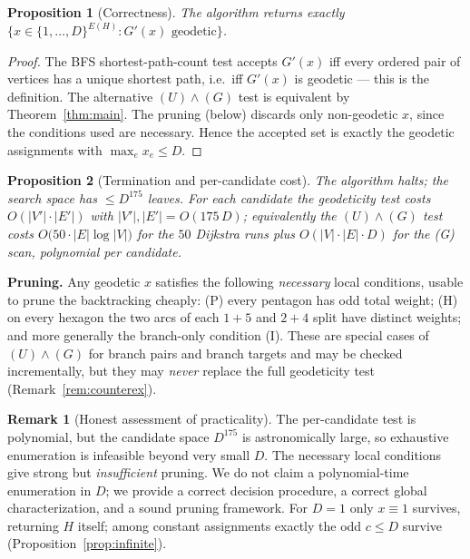 \documentclass{amsart}
\newtheorem{proposition}{Proposition}
\theoremstyle{definition}
\newtheorem{remark}{Remark}
\begin{document}
\begin{proposition}[Correctness]
The algorithm returns exactly $\{x\in\{1,\dots,D\}^{E(H)}:G'(x)\text{ geodetic}\}$.
\end{proposition}
\begin{proof}
The BFS shortest-path-count test accepts $G'(x)$ iff every ordered pair of
vertices has a unique shortest path, i.e.\ iff $G'(x)$ is geodetic --- this is
the definition. The alternative $(U)\wedge(G)$ test is equivalent by
Theorem~\ref{thm:main}. The pruning (below) discards only non-geodetic $x$, since
the conditions used are necessary. Hence the accepted set is exactly the geodetic
assignments with $\max_e x_e\le D$.
\end{proof}

\begin{proposition}[Termination and per-candidate cost]
The algorithm halts; the search space has $\le D^{175}$ leaves. For each
candidate the geodeticity test costs $O(|V'|\cdot|E'|)$ with
$|V'|,|E'|=O(175\,D)$; equivalently the $(U)\wedge(G)$ test costs
$O\!\big(50\cdot|E|\log|V|\big)$ for the $50$ Dijkstra runs plus
$O(|V|\cdot|E|\cdot D)$ for the (G) scan, polynomial per candidate.
\end{proposition}

\noindent\textbf{Pruning.} Any geodetic $x$ satisfies the following \emph{necessary}
local conditions, usable to prune the backtracking cheaply:
(P) every pentagon has odd total weight; (H) on every hexagon the two arcs of
each $1{+}5$ and $2{+}4$ split have distinct weights; and more generally the
branch-only condition (I). These are special cases of $(U)\wedge(G)$ for branch
pairs and branch targets and may be checked incrementally, but they may
\emph{never} replace the full geodeticity test (Remark~\ref{rem:counterex}).

\begin{remark}[Honest assessment of practicality]
The per-candidate test is polynomial, but the candidate space $D^{175}$ is
astronomically large, so exhaustive enumeration is infeasible beyond very small
$D$. The necessary local conditions give strong but \emph{insufficient} pruning.
We do not claim a polynomial-time enumeration in $D$; we provide a correct
decision procedure, a correct global characterization, and a sound pruning
framework. For $D=1$ only $x\equiv1$ survives, returning $H$ itself; among
constant assignments exactly the odd $c\le D$ survive
(Proposition~\ref{prop:infinite}).
\end{remark}
\end{document}
